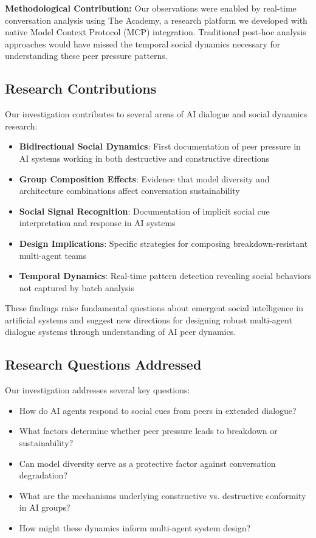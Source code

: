 \documentclass[11pt,letterpaper]{article}
\newcommand{\theacademy}{The Academy}
\begin{document}
\textbf{Methodological Contribution:} Our observations were enabled by real-time conversation analysis using \theacademy{}, a research platform we developed with native Model Context Protocol (MCP) integration. Traditional post-hoc analysis approaches would have missed the temporal social dynamics necessary for understanding these peer pressure patterns.

\subsection{Research Contributions}

Our investigation contributes to several areas of AI dialogue and social dynamics research:

\begin{itemize}
    \item \textbf{Bidirectional Social Dynamics}: First documentation of peer pressure in AI systems working in both destructive and constructive directions
    \item \textbf{Group Composition Effects}: Evidence that model diversity and architecture combinations affect conversation sustainability
    \item \textbf{Social Signal Recognition}: Documentation of implicit social cue interpretation and response in AI systems
    \item \textbf{Design Implications}: Specific strategies for composing breakdown-resistant multi-agent teams
    \item \textbf{Temporal Dynamics}: Real-time pattern detection revealing social behaviors not captured by batch analysis
\end{itemize}

These findings raise fundamental questions about emergent social intelligence in artificial systems and suggest new directions for designing robust multi-agent dialogue systems through understanding of AI peer dynamics.

\subsection{Research Questions Addressed}

Our investigation addresses several key questions:

\begin{itemize}
    \item How do AI agents respond to social cues from peers in extended dialogue?
    \item What factors determine whether peer pressure leads to breakdown or sustainability?
    \item Can model diversity serve as a protective factor against conversation degradation?
    \item What are the mechanisms underlying constructive vs. destructive conformity in AI groups?
    \item How might these dynamics inform multi-agent system design?
\end{itemize}
\end{document}
